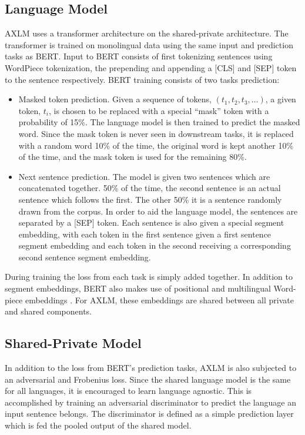 \documentclass[12pt,letterpaper,twocolumn]{article}
\begin{document}

\subsection{Language Model}
AXLM uses a transformer architecture on the shared-private architecture.  The transformer is trained on monolingual data using the same input and prediction tasks as BERT.  Input to BERT consists of first tokenizing sentences using WordPiece tokenization, the prepending and appending a [CLS] and [SEP] token to the sentence respectively.  BERT training consists of two tasks prediction:

\begin{itemize}
	\item Masked token prediction.  Given a sequence of tokens, $(t_1, t_2, t_3, \dots)$, a given token, $t_i$, is chosen to be replaced with a special ``mask'' token with a probability of 15\%.  The language model is then trained to predict the masked word.  Since the mask token is never seen in downstream tasks, it is replaced with a random word 10\% of the time, the original word is kept another 10\% of the time, and the mask token is used for the remaining 80\%.

	\item Next sentence prediction.  The model is given two sentences which are concatenated together.  50\% of the time, the second sentence is an actual sentence which follows the first.  The other 50\% it is a sentence randomly drawn from the corpus.  In order to aid the language model, the sentences are separated by a [SEP] token.  Each sentence is also given a special segment embedding, with each token in the first sentence given a first sentence segment embedding and each token in the second receiving a corresponding second sentence segment embedding.
\end{itemize}

During training the loss from each task is simply added together.  In addition to segment embeddings, BERT also makes use of positional and multilingual Word-piece embeddings \cite{}.  For AXLM, these embeddings are shared between all private and shared components.


\subsection{Shared-Private Model}
In addition to the loss from BERT's prediction tasks, AXLM is also subjected to an adversarial and Frobenius loss.  Since the shared language model is the same for all languages, it is encouraged to learn language agnostic.  This is accomplished by training an adversarial discriminator to predict the language an input sentence belongs.  The discriminator is defined as a simple prediction layer which is fed the pooled output of the shared model.
\end{document}
